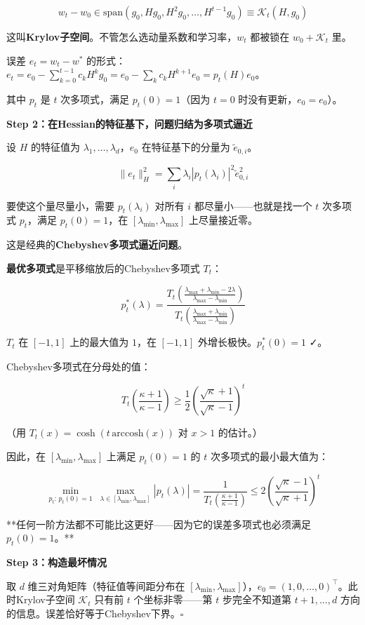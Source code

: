 \documentclass[12pt,a4paper]{article}
\begin{document}
\[w_t - w_0 \in \text{span}(g_0, Hg_0, H^2g_0, \ldots, H^{t-1}g_0) \equiv \mathcal{K}_t(H, g_0)\]

这叫\textbf{Krylov子空间}。不管怎么选动量系数和学习率，$w_t$ 都被锁在 $w_0 + \mathcal{K}_t$ 里。

误差 $e_t = w_t - w^*$ 的形式：$e_t = e_0 - \sum_{k=0}^{t-1} c_k H^k g_0 = e_0 - \sum_k c_k H^{k+1} e_0 = p_t(H) e_0$。

其中 $p_t$ 是 $t$ 次多项式，满足 $p_t(0) = 1$（因为 $t=0$ 时没有更新，$e_0 = e_0$）。

\textbf{Step 2：在Hessian的特征基下，问题归结为多项式逼近}

设 $H$ 的特征值为 $\lambda_1, \ldots, \lambda_d$，$e_0$ 在特征基下的分量为 $\tilde{e}_{0,i}$。


\[\|e_t\|_H^2 = \sum_i \lambda_i |p_t(\lambda_i)|^2 \tilde{e}_{0,i}^2\]

要使这个量尽量小，需要 $p_t(\lambda_i)$ 对所有 $i$ 都尽量小——也就是找一个 $t$ 次多项式 $p_t$，满足 $p_t(0) = 1$，在 $[\lambda_{\min}, \lambda_{\max}]$ 上尽量接近零。

这是经典的\textbf{Chebyshev多项式逼近问题}。

\textbf{最优多项式}是平移缩放后的Chebyshev多项式 $T_t$：


\[p_t^*(\lambda) = \frac{T_t\!\left(\frac{\lambda_{\max}+\lambda_{\min}-2\lambda}{\lambda_{\max}-\lambda_{\min}}\right)}{T_t\!\left(\frac{\lambda_{\max}+\lambda_{\min}}{\lambda_{\max}-\lambda_{\min}}\right)}\]

$T_t$ 在 $[-1, 1]$ 上的最大值为 $1$，在 $[-1, 1]$ 外增长极快。$p_t^*(0) = 1$ ✓。

Chebyshev多项式在分母处的值：


\[T_t\!\left(\frac{\kappa+1}{\kappa-1}\right) \ge \frac{1}{2}\left(\frac{\sqrt\kappa+1}{\sqrt\kappa-1}\right)^t\]

（用 $T_t(x) = \cosh(t\,\text{arccosh}(x))$ 对 $x > 1$ 的估计。）

因此，在 $[\lambda_{\min}, \lambda_{\max}]$ 上满足 $p_t(0)=1$ 的 $t$ 次多项式的最小最大值为：


\[\min_{p_t:\,p_t(0)=1}\ \max_{\lambda \in [\lambda_{\min},\lambda_{\max}]} |p_t(\lambda)| = \frac{1}{T_t\!\left(\frac{\kappa+1}{\kappa-1}\right)} \le 2\left(\frac{\sqrt\kappa-1}{\sqrt\kappa+1}\right)^t\]

**任何一阶方法都不可能比这更好——因为它的误差多项式也必须满足 $p_t(0)=1$。**

\textbf{Step 3：构造最坏情况}

取 $d$ 维三对角矩阵（特征值等间距分布在 $[\lambda_{\min}, \lambda_{\max}]$），$e_0 = (1,0,\ldots,0)^\top$。此时Krylov子空间 $\mathcal{K}_t$ 只有前 $t$ 个坐标非零——第 $t$ 步完全不知道第 $t+1, \ldots, d$ 方向的信息。误差恰好等于Chebyshev下界。$\square$
\end{document}
